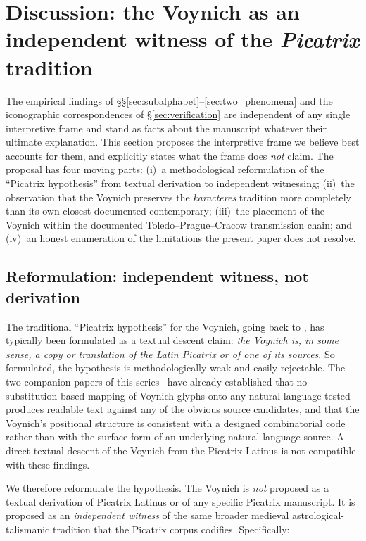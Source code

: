 \section{Discussion: the Voynich as an independent witness of the
\textit{Picatrix} tradition}
\label{sec:discussion}

The empirical findings of \S\S\ref{sec:subalphabet}--\ref{sec:two_phenomena}
and the iconographic correspondences of \S\ref{sec:verification} are
independent of any single interpretive frame and stand as facts about
the manuscript whatever their ultimate explanation. This section
proposes the interpretive frame we believe best accounts for them, and
explicitly states what the frame does \emph{not} claim. The proposal
has four moving parts: (i)~a methodological reformulation of the
``Picatrix hypothesis'' from textual derivation to independent
witnessing; (ii)~the observation that the Voynich preserves the
\textit{karacteres} tradition more completely than its own closest
documented contemporary; (iii)~the placement of the Voynich within
the documented Toledo--Prague--Cracow transmission chain; and
(iv)~an honest enumeration of the limitations the present paper does
not resolve.

\subsection{Reformulation: independent witness, not derivation}
\label{sec:reformulation}

The traditional ``Picatrix hypothesis'' for the Voynich, going back to
\citet{dimperio1978}, has typically been formulated as a textual
descent claim: \emph{the Voynich is, in some sense, a copy or
translation of the Latin Picatrix or of one of its sources}. So
formulated, the hypothesis is methodologically weak and easily
rejectable. The two companion papers of this series~\citep{jimenez2026negative,
jimenez2026twotier} have already established that no substitution-based
mapping of Voynich glyphs onto any natural language tested produces
readable text against any of the obvious source candidates, and that
the Voynich's positional structure is consistent with a designed
combinatorial code rather than with the surface form of an underlying
natural-language source. A direct textual descent of the Voynich from
the Picatrix Latinus is not compatible with these findings.

We therefore reformulate the hypothesis. The Voynich is \emph{not}
proposed as a textual derivation of Picatrix Latinus or of any
specific Picatrix manuscript. It is proposed as an \emph{independent
witness} of the same broader medieval astrological-talismanic tradition
that the Picatrix corpus codifies. Specifically:

